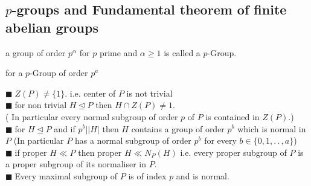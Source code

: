 \documentclass[11pt]{extarticle}
\newcommand{\ck}{.\,.\,}
\newcommand{\snote}[1]{{\footnotesize(#1)}}
\newcommand{\y}{$\blacksquare\;$}
\newcommand{\tbx}[2][]{
	\begin{tcolorbox}[enhanced,breakable,size=small,colback=black!2!white,title={#1},arc is angular, arc=1.5mm,drop fuzzy shadow]
		#2
	\end{tcolorbox}
}
\begin{document}
\begin{multicols}{2}
	\subsection{$ p $-groups and Fundamental theorem of finite abelian groups}
	
	\tbx{a group of order $ p^\alpha $ for $ p $ prime and $ \alpha \geq 1 $ is called a $ p $-Group.
	}
	\tbx{for a $ p $-Group of order $ p^a $ 
		
		\y  $ Z(P) \neq \{1 \}.$ i.e. center of $ P $ is not trivial \\
		\y  for non trivial $ H \trianglelefteq P $ then $ H \cap Z(P) \neq 1 .$ \\ 
		\snote{ In particular every normal subgroup of order $ p $ of $ P $ is contained in $ Z(P) .$}\\
		\y  for $ H \trianglelefteq P $ and if $ p^b | |H| $ then $ H $ contains a group of order $ p^b $ which is normal in $ P $ (In particular $ P $ has a normal subgroup of order $ p^b $ for every $b \in \{0,1,\ck , a\} $) \\
		\y  if proper $ H \ll  P $ then proper $ H \ll N_P(H) $ i.e. every proper subgroup of $ P $ is a proper subgroup of its normaliser in $ P .$ \\
		\y  Every maximal subgroup of $ P $ is of index $ p $  and is normal. 
		
}
\end{multicols}
\end{document}
